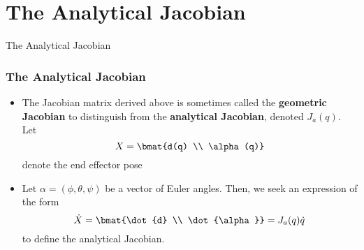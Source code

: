 \section{The Analytical Jacobian}

\begin{frame}
    The Analytical Jacobian


\end{frame}

\begingroup
\small



\begin{frame}
    \frametitle{The Analytical Jacobian}

    \begin{itemize}
        \item The Jacobian matrix derived above is sometimes called the
        \textbf{geometric Jacobian} to distinguish from the \textbf{analytical
        Jacobian}, denoted $J_a(q)$. Let \[ X = \bmat{d(q) \\ \alpha(q)} \]
        denote the end effector pose
        \item Let $\alpha = (\phi, \theta, \psi)$ be a vector of Euler angles.
        Then, we seek an expression of the form \[ \dot{X} = \bmat{\dot{d} \\
        \dot{\alpha}} = J_a(q)\dot{q} \] to define the analytical Jacobian.
    \end{itemize}
\end{frame}


